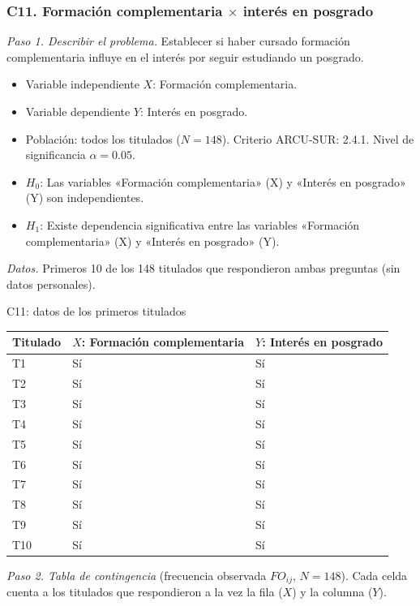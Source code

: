 \subsubsection*{C11. Formación complementaria $\times$ interés en posgrado}

\textit{Paso 1. Describir el problema.} Establecer si haber cursado formación complementaria influye en el interés por seguir estudiando un posgrado.

\begin{itemize}[nosep]
  \item Variable independiente $X$: Formación complementaria.
  \item Variable dependiente $Y$: Interés en posgrado.
  \item Población: todos los titulados ($N = 148$). Criterio ARCU-SUR: 2.4.1. Nivel de significancia $\alpha = 0.05$.
  \item $H_0$: Las variables «Formación complementaria» (X) y «Interés en posgrado» (Y) son independientes.
  \item $H_1$: Existe dependencia significativa entre las variables «Formación complementaria» (X) y «Interés en posgrado» (Y).
\end{itemize}

\textit{Datos.} Primeros 10 de los 148 titulados que respondieron ambas preguntas (sin datos personales).

\begin{mitabla}{C11: datos de los primeros titulados}
\begin{tabular}{lll}
\toprule
Titulado & $X$: Formación complementaria & $Y$: Interés en posgrado \\
\midrule
T1 & Sí & Sí \\
T2 & Sí & Sí \\
T3 & Sí & Sí \\
T4 & Sí & Sí \\
T5 & Sí & Sí \\
T6 & Sí & Sí \\
T7 & Sí & Sí \\
T8 & Sí & Sí \\
T9 & Sí & Sí \\
T10 & Sí & Sí \\
\bottomrule
\end{tabular}
\end{mitabla}

\textit{Paso 2. Tabla de contingencia} (frecuencia observada $FO_{ij}$, $N = 148$). Cada celda cuenta a los titulados que respondieron a la vez la fila ($X$) y la columna ($Y$).

